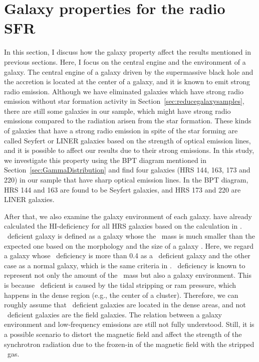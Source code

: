 \section{Galaxy properties for the radio SFR}\label{sec:galaxypropertiesfortheradiosfr}

In this section, I discuss how the galaxy property affect the results mentioned in previous sections.
Here, I focus on the central engine and the environment of a galaxy.
The central engine of a galaxy driven by the supermassive black hole and the accretion is located at the center of a galaxy, and it is known to emit strong radio emission.
Although we have eliminated galaxies which have strong radio emission without star formation activity in Section~\ref{sec:reducegalaxysamples}, there are still some galaxies in our sample, which might have strong radio emissions compared to the radiation arisen from the star formation.
These kinds of galaxies that have a strong radio emission in spite of the star forming are called Seyfert or LINER galaxies based on the strength of optical emission lines, and it is possible to affect our results due to their strong emissions.
In this study, we investigate this property using the BPT diagram mentioned in Section~\ref{sec:GammaDistribution} and find four galaxies (HRS 144, 163, 173 and 220) in our sample that have sharp optical emission lines.
In the BPT diagram, HRS 144 and 163 are found to be Seyfert galaxies, and HRS 173 and 220 are LINER galaxies.

After that, we also examine the galaxy environment of each galaxy.
\citet{Boselli2014} have already calculated the HI-deficiency for all HRS galaxies based on the calculation in \citet{Boselli2009}.
\nh~deficient galaxy is defined as a galaxy whose the \nh~mass is much smaller than the expected one based on the morphology and the size of a galaxy \citep{Haynes1984}.
Here, we regard a galaxy whose \nh~deficiency is more than 0.4 as a \nh~deficient galaxy and the other case as a normal galaxy, which is the same criteria in \citet{Ciesla2016}.
\nh~deficiency is known to represent not only the amount of the \nh~mass but also a galaxy environment.
This is because \nh~deficient is caused by the tidal stripping or ram pressure, which happens in the dense region (e.g., the center of a cluster).
Therefore, we can roughly assume that \nh~deficient galaxies are located in the dense areas, and not \nh~deficient galaxies are the field galaxies.
The relation between a galaxy environment and low-frequency emissions are still not fully understood.
Still, it is a possible scenario to distort the magnetic field and affect the strength of the synchrotron radiation due to the frozen-in of the magnetic field with the stripped \nh~gas.

